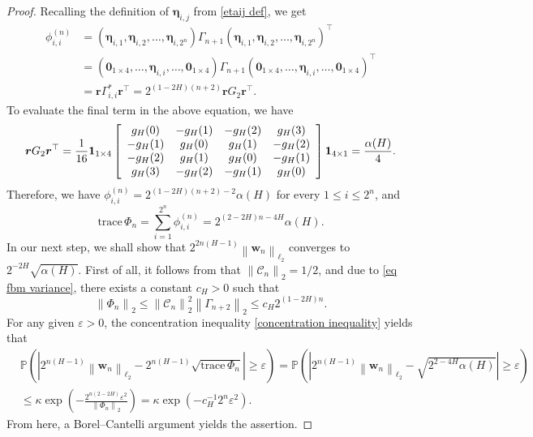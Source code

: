 \documentclass[12pt,reqno]{article}
\def\trace#1{\text{trace}\, #1}
\newcommand{\norm}[1]{\left\lVert {#1}\right\rVert}
\numberwithin{equation}{section}
\theoremstyle{definition}
\newcommand{\bP}{\mathbb{P}}
\begin{document}
\begin{proof}
	Recalling the definition of $\bm\eta_{i,j}$ from \eqref{etaij def}, we get 
	\begin{equation*}
	\begin{split}
	\phi^{(n)}_{i,i}  &= \left(
	\bm\eta_{i,1}, \bm\eta_{i,2}, \dots,    \bm\eta_{i,2^{n}}	\right)\Gamma_{n+1}\left(
	\bm\eta_{i,1},  \bm\eta_{i,2},\dots , \bm\eta_{i,2^{n}}
	\right)^\top 
	\\&= \left(
		\bm 0_{1\times 4},  \dots, \bm\eta_{i,i},   \dots,\bm 0_{1\times 4}
	\right)\Gamma_{n+1}\left(
	\bm 0_{1\times 4},  \dots, \bm\eta_{i,i},  \dots,  \bm 0_{1\times 4}
	\right)^\top \\&= \bm r\Gamma^{\ast}_{i,i}\bm r^\top = 2^{(1-2H)(n+2)}\bm rG_2\bm r^\top.
	\end{split}
	\end{equation*}
		To evaluate the final term in the above equation, we have 
	\begin{equation*}
	\bm rG_2\bm r^\top  =\frac{1}{16}\bm 1_{1 \times 4}\left[\begin{array}{c c c c}
	g_H(0) & -g_H(1) & -g_H(2) & g_H(3)\\
	-g_H(1) & g_H(0) & g_H(1) & -g_H(2)\\
	-g_H(2) & g_H(1) & g_H(0) & -g_H(1)\\
	g_H(3) &- g_H(2) & -g_H(1) & g_H(0)\\
	\end{array}
	\right]\bm 1_{4 \times 1} = \frac{\alpha(H)}{4}.
	\end{equation*}
	Therefore, we have $\phi^{(n)}_{i,i} = 2^{(1-2H)(n+2)-2}\alpha(H)$ for every $1 \le i \le 2^n$, and 
	\begin{equation*}
	\trace{\Phi_n} = \sum_{i = 1}^{2^n}\phi^{(n)}_{i,i} = 2^{(2-2H)n-4H}\alpha(H).
	\end{equation*}
	In our next step, we shall show that $2^{2n(H-1)}\norm{\bm w_n}_{\ell_2}$ converges to $2^{-2H}\sqrt{\alpha(H)}$. First of all, it follows from \cite[Lemma 3.4]{HanSchiedMatrix} that $\norm{\mathscr{C}_n }_2 = 1/2$, and due to \eqref{eq fbm variance}, there exists a constant $c_H > 0$ such that  
	\begin{equation*}
	\norm{\Phi_n}_2 \le \norm{\mathscr{C}_n }^2_2 \norm{\Gamma_{n+2}}_2 \le c_H2^{(1-2H)n}.
	\end{equation*}
	For any given $\varepsilon > 0$, the concentration inequality \eqref{concentration inequality}
 yields that 
	\begin{equation*}
	\begin{split}
	&\bP\left(\left|2^{n(H-1)}\norm{\bm w_n}_{\ell_2}- 2^{n(H-1)}\sqrt{	\trace{\Phi_n}}\right| \ge \varepsilon\right) = \bP\left(\left|2^{n(H-1)}\norm{\bm w_n}_{\ell_2}- \sqrt{2^{2-4H}\alpha(H)}\right| \ge \varepsilon\right)  \\& \le \kappa\exp\left(-\frac{2^{n(2-2H)}\varepsilon^2}{\norm{\Phi_n}_2}\right)= \kappa\exp(-c^{-1}_H2^{n}\varepsilon^2).
	\end{split}
	\end{equation*}
From here, a Borel--Cantelli argument yields the assertion.
\end{proof}
\end{document}
